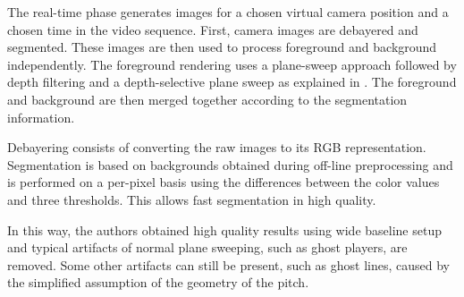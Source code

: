 The real-time phase generates images for a chosen virtual camera position and a chosen time in the video sequence.
First, camera images are debayered and segmented. These images are then used to process foreground and background independently.
The foreground rendering uses a plane-sweep approach followed by depth filtering and a depth-selective plane sweep 
as explained in \cite{05_plane_sweeping}.
The foreground and background are then merged together according to the segmentation information.

Debayering consists of converting the raw images to its RGB representation.
Segmentation is based on backgrounds obtained during off-line preprocessing and is performed on a per-pixel basis using
the differences between the color values and three thresholds.
This allows fast segmentation in high quality.


In this way, the authors obtained high quality results using wide baseline setup and typical artifacts of normal plane sweeping, 
such as ghost players, are removed.
Some other artifacts can still be present, such as ghost lines, caused by the simplified assumption of the geometry of the pitch.

